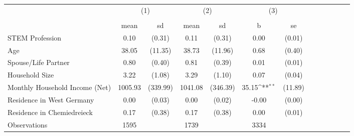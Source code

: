 {
\def\sym#1{\ifmmode^{#1}\else\(^{#1}\)\fi}
\begin{tabular}{l*{3}{cccc}}
\hline\hline
                    &\multicolumn{2}{c}{(1)}  &\multicolumn{2}{c}{(2)}  &\multicolumn{2}{c}{(3)}           \\
                    &\multicolumn{2}{c}{}     &\multicolumn{2}{c}{}     &\multicolumn{2}{c}{}              \\
                    &        mean&          sd&        mean&          sd&           b         &          se\\
\hline
STEM Profession     &        0.10&      (0.31)&        0.11&      (0.31)&        0.00         &      (0.01)\\
Age                 &       38.05&     (11.35)&       38.73&     (11.96)&        0.68         &      (0.40)\\
Spouse/Life Partner &        0.80&      (0.40)&        0.81&      (0.39)&        0.01         &      (0.01)\\
Household Size      &        3.22&      (1.08)&        3.29&      (1.10)&        0.07         &      (0.04)\\
Monthly Household Income (Net)&     1005.93&    (339.99)&     1041.08&    (346.39)&       35.15\sym{**} &     (11.89)\\
Residence in West Germany&        0.00&      (0.03)&        0.00&      (0.02)&       -0.00         &      (0.00)\\
Residence in Chemiedreieck&        0.17&      (0.38)&        0.17&      (0.38)&        0.00         &      (0.01)\\
\hline
Observations        &        1595&            &        1739&            &        3334         &            \\
\hline\hline
\end{tabular}
}
